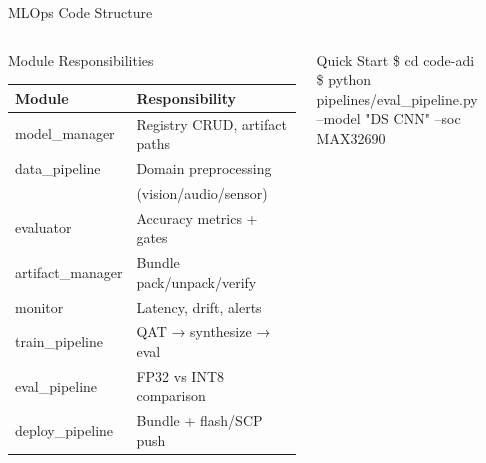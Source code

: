 \documentclass[aspectratio=169,10pt]{beamer}
\begin{document}
\begin{frame}{MLOps Code Structure}
\begin{columns}[T]
    \begin{block}{Module Responsibilities}
      \renewcommand{\arraystretch}{1.2}
      {\small
      \begin{tabular}{@{}>{\ttfamily\scriptsize}l >{\scriptsize}l@{}}
        \toprule
        Module & Responsibility \\
        \midrule
        model\_manager & Registry CRUD, artifact paths \\
        data\_pipeline & Domain preprocessing\\
                       & (vision/audio/sensor) \\
        evaluator & Accuracy metrics + gates \\
        artifact\_manager & Bundle pack/unpack/verify \\
        monitor & Latency, drift, alerts \\
        train\_pipeline & QAT → synthesize → eval \\
        eval\_pipeline & FP32 vs INT8 comparison \\
        deploy\_pipeline & Bundle + flash/SCP push \\
        \bottomrule
      \end{tabular}}
    \end{block}
    \vspace{4pt}
    \begin{alertblock}{Quick Start}
      {\small\ttfamily
      \$ cd code-adi\\
      \$ python pipelines/eval\_pipeline.py\\
      \quad --model "DS CNN" --soc MAX32690}
    \end{alertblock}
  \end{columns}
\end{frame}
\end{document}
